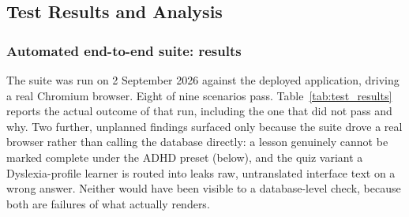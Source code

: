 \documentclass[12pt, oneside]{article} %
\begin{document}
\subsection{Test Results and Analysis}
\label{sec:test-results}

\subsubsection{Automated end-to-end suite: results}

The suite was run on 2 September 2026 against the deployed application, driving a real Chromium browser. Eight of nine scenarios pass. Table~\ref{tab:test_results} reports the actual outcome of that run, including the one that did not pass and why. Two further, unplanned findings surfaced only because the suite drove a real browser rather than calling the database directly: a lesson genuinely cannot be marked complete under the ADHD preset (below), and the quiz variant a Dyslexia-profile learner is routed into leaks raw, untranslated interface text on a wrong answer. Neither would have been visible to a database-level check, because both are failures of what actually renders.
\end{document}
